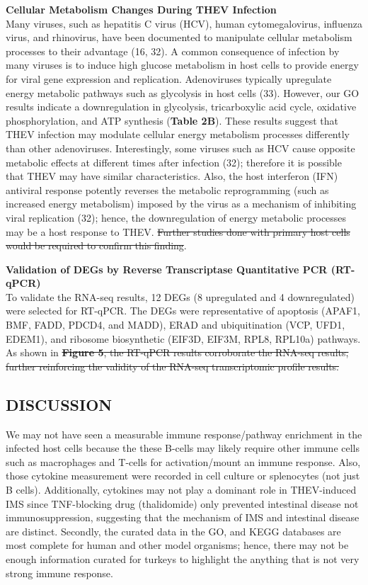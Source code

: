 \documentclass[
]{article}
\begin{document}
\textbf{Cellular Metabolism Changes During THEV Infection}\\
Many viruses, such as hepatitis C virus (HCV), human cytomegalovirus,
influenza virus, and rhinovirus, have been documented to manipulate
cellular metabolism processes to their advantage (16, 32). A common
consequence of infection by many viruses is to induce high glucose
metabolism in host cells to provide energy for viral gene expression and
replication. Adenoviruses typically upregulate energy metabolic pathways
such as glycolysis in host cells (33). However, our GO results indicate
a downregulation in glycolysis, tricarboxylic acid cycle, oxidative
phosphorylation, and ATP synthesis (\textbf{Table 2B}). These results
suggest that THEV infection may modulate cellular energy metabolism
processes differently than other adenoviruses. Interestingly, some
viruses such as HCV cause opposite metabolic effects at different times
after infection (32); therefore it is possible that THEV may have
similar characteristics. Also, the host interferon (IFN) antiviral
response potently reverses the metabolic reprogramming (such as
increased energy metabolism) imposed by the virus as a mechanism of
inhibiting viral replication (32); hence, the downregulation of energy
metabolic processes may be a host response to THEV. \st{Further studies
done with primary host cells would be required to confirm this finding}.

\textbf{Validation of DEGs by Reverse Transcriptase Quantitative PCR
(RT-qPCR)}\\
To validate the RNA-seq results, 12 DEGs (8 upregulated and 4
downregulated) were selected for RT-qPCR. The DEGs were representative
of apoptosis (APAF1, BMF, FADD, PDCD4, and MADD), ERAD and
ubiquitination (VCP, UFD1, EDEM1), and ribosome biosynthetic (EIF3D,
EIF3M, RPL8, RPL10a) pathways. As shown in \st{\textbf{Figure 5}, the
RT-qPCR results corroborate the RNA-seq results, further reinforcing the
validity of the RNA-seq transcriptomic profile results.} \newpage

\subsection{DISCUSSION}\label{discussion}

We may not have seen a measurable immune response/pathway enrichment in
the infected host cells because the these B-cells may likely require
other immune cells such as macrophages and T-cells for activation/mount
an immune response. Also, those cytokine measurement were recorded in
cell culture or splenocytes (not just B cells). Additionally, cytokines
may not play a dominant role in THEV-induced IMS since TNF-blocking drug
(thalidomide) only prevented intestinal disease not immunosuppression,
suggesting that the mechanism of IMS and intestinal disease are
distinct. Secondly, the curated data in the GO, and KEGG databases are
most complete for human and other model organisms; hence, there may not
be enough information curated for turkeys to highlight the anything that
is not very strong immune response. \newpage
\end{document}
